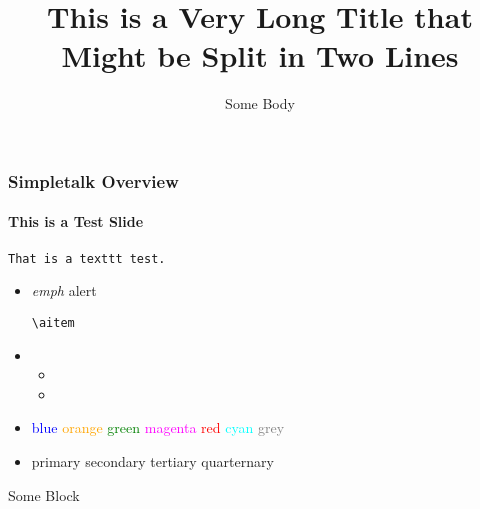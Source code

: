 \documentclass[aspectratio=169]{beamer}
\title{This is a Very Long Title that Might be Split in Two Lines}
\author{Some Body}
\institute{Some University}
\date{}
\begin{document}
\begin{frame}
    \titlepage
\end{frame}

\begin{frame}
    \frametitle{Simpletalk Overview}
    \framesubtitle{This is a Test Slide}
    \lipsum[1][2-3]
    \texttt{That is a texttt test.}
    \begin{itemize}
        \item {} \emph{emph}    \alert{alert}
        \begin{itemize}
            \aitem \texttt{\textbackslash aitem} \lipsum[1][1]
        \end{itemize}
        \item \lipsum[1][2-4]
        \begin{itemize}
            \item \lipsum[1][2-4]
            \item \lipsum[1][1]
        \end{itemize}
        \item
            \textcolor{blue}{blue}
            \textcolor{orange}{orange}
            \textcolor{green}{green}
            \textcolor{magenta}{magenta}
            \textcolor{red}{red}
            \textcolor{cyan}{cyan}
            \textcolor{grey}{grey}
        \item
            \textcolor{primary}{primary}
            \textcolor{secondary}{secondary}
            \textcolor{tertiary}{tertiary}
            \textcolor{quarternary}{quarternary}
    \end{itemize}
    \begin{block}{Some Block}
       \lipsum[1][1] \faChessKnight
    \end{block}
\end{frame}
\end{document}
